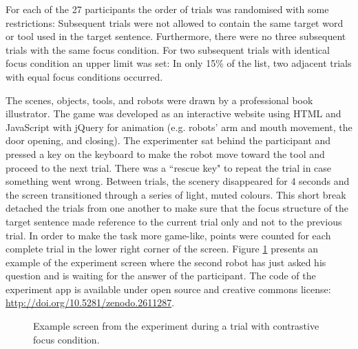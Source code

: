 For each of the 27 participants the order of trials was randomised with some restrictions: Subsequent trials were not allowed to contain the same target word or tool used in the target sentence. Furthermore, there were no three subsequent trials with the same focus condition. For two subsequent trials with identical focus condition an upper limit was set: In only 15\% of the list, two adjacent trials with equal focus conditions occurred.

The scenes, objects, tools, and robots were drawn by a professional book illustrator. The game was developed as an interactive website using HTML and JavaScript with jQuery for animation (e.g. robots' arm and mouth movement, the door opening, and closing). The experimenter sat behind the participant and pressed a key on the keyboard to make the robot move toward the tool and proceed to the next trial. There was a ``rescue key" to repeat the trial in case something went wrong. Between trials, the scenery disappeared for 4 seconds and the screen transitioned through a series of light, muted colours. This short break detached the trials from one another to make sure that the focus structure of the target sentence made reference to the current trial only and not to the previous trial. In order to make the task more game-like, points were counted for each complete trial in the lower right corner of the screen. Figure \ref{fig:exp_trial} presents an example of the experiment screen where the second robot has just asked his question and is waiting for the answer of the participant. The code of the experiment app is available under open source and creative commons license: \href{http://doi.org/10.5281/zenodo.2611287}{http://doi.org/10.5281/zenodo.2611287}.

\begin{figure}
\caption{Example screen from the experiment during a trial with contrastive focus condition.}
\label{fig:exp_trial}
\end{figure}

